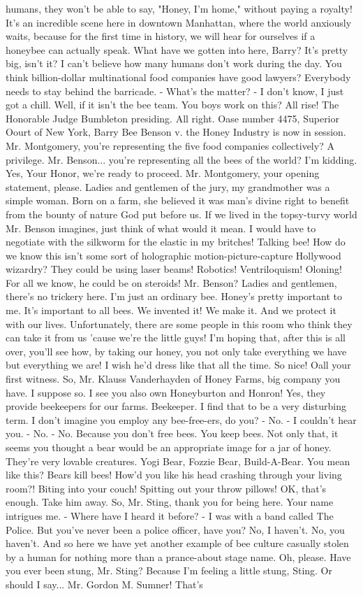 \documentclass{article}
\begin{document}
humans, they won't be able to say, "Honey, I'm home," without paying a royalty! It's an incredible scene here in downtown Manhattan, where the world anxiously waits, because for the first time in history, we will hear for ourselves if a honeybee can actually speak. What have we gotten into here, Barry? It's pretty big, isn't it? I can't believe how many humans don't work during the day. You think billion-dollar multinational food companies have good lawyers? Everybody needs to stay behind the barricade. - What's the matter? - I don't know, I just got a chill. Well, if it isn't the bee team. You boys work on this? All rise! The Honorable Judge Bumbleton presiding. All right. Oase number 4475, Superior Oourt of New York, Barry Bee Benson v. the Honey Industry is now in session. Mr. Montgomery, you're representing the five food companies collectively? A privilege. Mr. Benson... you're representing all the bees of the world? I'm kidding. Yes, Your Honor, we're ready to proceed. Mr. Montgomery, your opening statement, please. Ladies and gentlemen of the jury, my grandmother was a simple woman. Born on a farm, she believed it was man's divine right to benefit from the bounty of nature God put before us. If we lived in the topsy-turvy world Mr. Benson imagines, just think of what would it mean. I would have to negotiate with the silkworm for the elastic in my britches! Talking bee! How do we know this isn't some sort of holographic motion-picture-capture Hollywood wizardry? They could be using laser beams! Robotics! Ventriloquism! Oloning! For all we know, he could be on steroids! Mr. Benson? Ladies and gentlemen, there's no trickery here. I'm just an ordinary bee. Honey's pretty important to me. It's important to all bees. We invented it! We make it. And we protect it with our lives. Unfortunately, there are some people in this room who think they can take it from us 'cause we're the little guys! I'm hoping that, after this is all over, you'll see how, by taking our honey, you not only take everything we have but everything we are! I wish he'd dress like that all the time. So nice! Oall your first witness. So, Mr. Klauss Vanderhayden of Honey Farms, big company you have. I suppose so. I see you also own Honeyburton and Honron! Yes, they provide beekeepers for our farms. Beekeeper. I find that to be a very disturbing term. I don't imagine you employ any bee-free-ers, do you? - No. - I couldn't hear you. - No. - No. Because you don't free bees. You keep bees. Not only that, it seems you thought a bear would be an appropriate image for a jar of honey. They're very lovable creatures. Yogi Bear, Fozzie Bear, Build-A-Bear. You mean like this? Bears kill bees! How'd you like his head crashing through your living room?! Biting into your couch! Spitting out your throw pillows! OK, that's enough. Take him away. So, Mr. Sting, thank you for being here. Your name intrigues me. - Where have I heard it before? - I was with a band called The Police. But you've never been a police officer, have you? No, I haven't. No, you haven't. And so here we have yet another example of bee culture casually stolen by a human for nothing more than a prance-about stage name. Oh, please. Have you ever been stung, Mr. Sting? Because I'm feeling a little stung, Sting. Or should I say... Mr. Gordon M. Sumner! That's 
\end{document}
